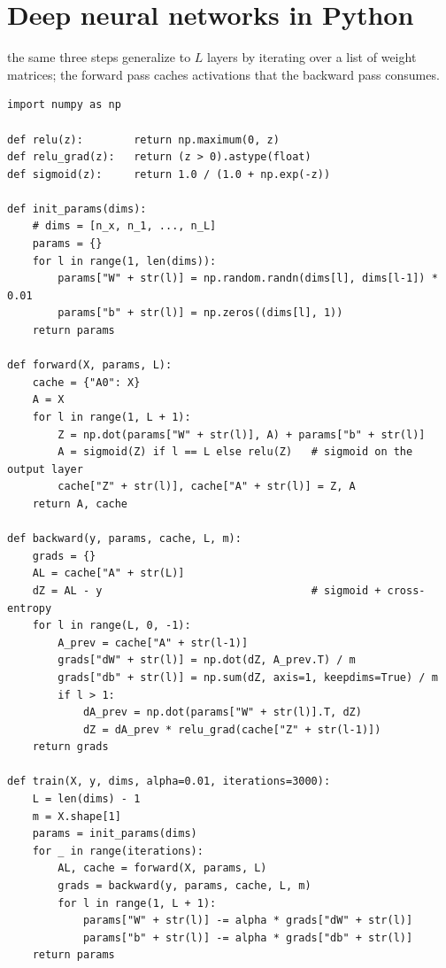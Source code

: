 \documentclass[4apaper,12pt]{book}
\begin{document}
\section{Deep neural networks in Python}
\begin{description}
\item the same three steps generalize to $L$ layers by iterating over a list of weight matrices; the forward pass caches activations that the backward pass consumes.
\end{description}
\begin{lstlisting}[caption={an L-layer feed-forward network with numpy}]
import numpy as np

def relu(z):        return np.maximum(0, z)
def relu_grad(z):   return (z > 0).astype(float)
def sigmoid(z):     return 1.0 / (1.0 + np.exp(-z))

def init_params(dims):
    # dims = [n_x, n_1, ..., n_L]
    params = {}
    for l in range(1, len(dims)):
        params["W" + str(l)] = np.random.randn(dims[l], dims[l-1]) * 0.01
        params["b" + str(l)] = np.zeros((dims[l], 1))
    return params

def forward(X, params, L):
    cache = {"A0": X}
    A = X
    for l in range(1, L + 1):
        Z = np.dot(params["W" + str(l)], A) + params["b" + str(l)]
        A = sigmoid(Z) if l == L else relu(Z)   # sigmoid on the output layer
        cache["Z" + str(l)], cache["A" + str(l)] = Z, A
    return A, cache

def backward(y, params, cache, L, m):
    grads = {}
    AL = cache["A" + str(L)]
    dZ = AL - y                                 # sigmoid + cross-entropy
    for l in range(L, 0, -1):
        A_prev = cache["A" + str(l-1)]
        grads["dW" + str(l)] = np.dot(dZ, A_prev.T) / m
        grads["db" + str(l)] = np.sum(dZ, axis=1, keepdims=True) / m
        if l > 1:
            dA_prev = np.dot(params["W" + str(l)].T, dZ)
            dZ = dA_prev * relu_grad(cache["Z" + str(l-1)])
    return grads

def train(X, y, dims, alpha=0.01, iterations=3000):
    L = len(dims) - 1
    m = X.shape[1]
    params = init_params(dims)
    for _ in range(iterations):
        AL, cache = forward(X, params, L)
        grads = backward(y, params, cache, L, m)
        for l in range(1, L + 1):
            params["W" + str(l)] -= alpha * grads["dW" + str(l)]
            params["b" + str(l)] -= alpha * grads["db" + str(l)]
    return params
\end{lstlisting}
\end{document}
